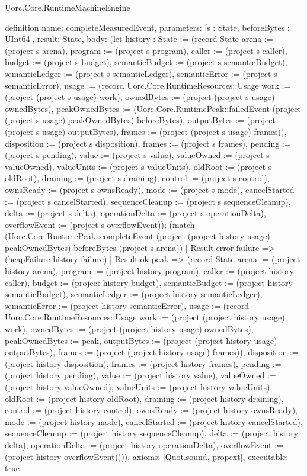 \begin{lexlean}{Uorc.Core.RuntimeMachineEngine}
\begin{semanticmodule}
definition{
  name: completeMeasuredEvent,
  parameters: [s : State, beforeBytes : UInt64],
  result: State,
  body: (let history : State := (record State {arena := (project s arena), program := (project s program), caller := (project s caller), budget := (project s budget), semanticBudget := (project s semanticBudget), semanticLedger := (project s semanticLedger), semanticError := (project s semanticError), usage := (record Uorc.Core.RuntimeResources::Usage {work := (project (project s usage) work), ownedBytes := (project (project s usage) ownedBytes), peakOwnedBytes := (Uorc.Core.RuntimePeak::failedEvent (project (project s usage) peakOwnedBytes) beforeBytes), outputBytes := (project (project s usage) outputBytes), frames := (project (project s usage) frames)}), disposition := (project s disposition), frames := (project s frames), pending := (project s pending), value := (project s value), valueOwned := (project s valueOwned), valueUnits := (project s valueUnits), oldRoot := (project s oldRoot), draining := (project s draining), control := (project s control), ownsReady := (project s ownsReady), mode := (project s mode), cancelStarted := (project s cancelStarted), sequenceCleanup := (project s sequenceCleanup), delta := (project s delta), operationDelta := (project s operationDelta), overflowEvent := (project s overflowEvent)}); (match (Uorc.Core.RuntimePeak::completeEvent (project (project history usage) peakOwnedBytes) beforeBytes (project s arena))
    | Result.error failure => (heapFailure history failure)
    | Result.ok peak => (record State {arena := (project history arena), program := (project history program), caller := (project history caller), budget := (project history budget), semanticBudget := (project history semanticBudget), semanticLedger := (project history semanticLedger), semanticError := (project history semanticError), usage := (record Uorc.Core.RuntimeResources::Usage {work := (project (project history usage) work), ownedBytes := (project (project history usage) ownedBytes), peakOwnedBytes := peak, outputBytes := (project (project history usage) outputBytes), frames := (project (project history usage) frames)}), disposition := (project history disposition), frames := (project history frames), pending := (project history pending), value := (project history value), valueOwned := (project history valueOwned), valueUnits := (project history valueUnits), oldRoot := (project history oldRoot), draining := (project history draining), control := (project history control), ownsReady := (project history ownsReady), mode := (project history mode), cancelStarted := (project history cancelStarted), sequenceCleanup := (project history sequenceCleanup), delta := (project history delta), operationDelta := (project history operationDelta), overflowEvent := (project history overflowEvent)}))),
  axioms: [Quot.sound, propext],
  executable: true
}


\end{semanticmodule}
\end{lexlean}
